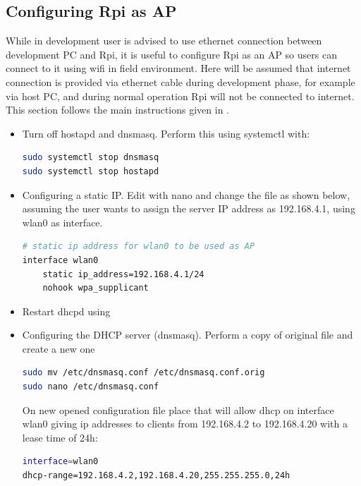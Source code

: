 \subsection{Configuring Rpi as AP}
While in development user is advised to use ethernet connection between development PC and \gls{Rpi}, it is useful to configure \gls{Rpi} as an \gls{AP} so users can connect to it using wifi in field environment. Here will be assumed that internet connection is provided via ethernet cable during development phase, for example via host PC, and during normal operation \gls{Rpi} will not be connected to internet. This section follows the main instructions given in \cite{raspberry_AP}.
\begin{itemize}
	\tightlist
	\item Turn off hostapd and dnsmasq. Perform this using systemctl with:
	\begin{lstlisting}[frame=none,language=bash,backgroundcolor=\color{gray!15},numbers=none,		basicstyle=\ttfamily]
sudo systemctl stop dnsmasq
sudo systemctl stop hostapd
\end{lstlisting}
	\item Configuring a static IP. Edit  with nano and change the file as shown below, assuming the user wants to assign the server IP address as 192.168.4.1, using wlan0 as interface.
	\begin{lstlisting}[frame=none,language=bash,backgroundcolor=\color{gray!15},numbers=none,		basicstyle=\ttfamily]
# static ip address for wlan0 to be used as AP
interface wlan0
    static ip_address=192.168.4.1/24
    nohook wpa_supplicant
\end{lstlisting}
   	\item Restart dhcpd using 
   	\item Configuring the DHCP server (dnsmasq). Perform a copy of original file and create a new one
\begin{lstlisting}[frame=none,language=bash,backgroundcolor=\color{gray!15},numbers=none,		basicstyle=\ttfamily]
sudo mv /etc/dnsmasq.conf /etc/dnsmasq.conf.orig  
sudo nano /etc/dnsmasq.conf
\end{lstlisting}
   	On new opened configuration file place that will allow dhcp on interface wlan0 giving ip addresses to clients from 192.168.4.2 to 192.168.4.20 with a lease time of 24h:
   	\begin{lstlisting}[frame=none,language=bash,backgroundcolor=\color{gray!15},numbers=none,		basicstyle=\ttfamily]
interface=wlan0
dhcp-range=192.168.4.2,192.168.4.20,255.255.255.0,24h

\end{lstlisting}
\end{itemize}
